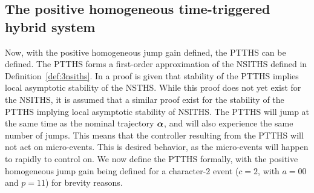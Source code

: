 \documentclass[../DC2017114Bouma.tex]{subfiles}
\begin{document}
\subsection{The positive homogeneous time-triggered hybrid system}\label{def:4PTTHS}
Now, with the positive homogeneous jump gain defined, the PTTHS can be defined. The PTTHS forms a first-order approximation of the NSITHS defined in Definition~\ref{def:3nsiths}. In \cite{Rijnen2018} a proof is given that stability of the PTTHS implies local asymptotic stability of the NSTHS. While this proof does not yet exist for the NSITHS, it is assumed that a similar proof exist for the stability of the PTTHS implying local asymptotic stability of NSITHS. The PTTHS will jump at the same time as the nominal trajectory $\boldsymbol{\alpha}$, and will also experience the same number of jumps. This means that the controller resulting from the PTTHS will not act on micro-events. This is desired behavior, as the micro-events will happen to rapidly to control on. We now define the PTTHS formally, with the positive homogeneous jump gain being defined for a character-2 event ($c = 2$, with $a = 00$ and $p=11$) for brevity reasons.
\end{document}
